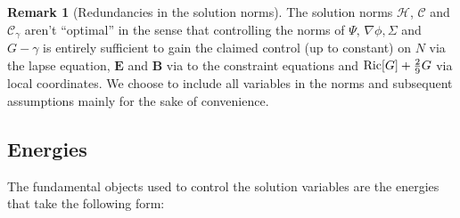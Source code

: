 \documentclass[11pt,leqno,textwidth=10cm]{amsart}
\numberwithin{equation}{section}
\theoremstyle{definition}
\newtheorem{remark}[definition]{Remark}
\theoremstyle{plain}
\newcommand{\1}{\mathbbm{1}}
\newcommand{\Ric}{\text{\normalfont{Ric}}}
\newcommand{\RE}{\bm{E}}
\newcommand{\RB}{\bm{B}}
\begin{document}
\begin{remark}[Redundancies in the solution norms]\label{rem:redundancy}
The solution norms $\mathcal{H}$, $\mathcal{C}$ and $\mathcal{C}_\gamma$ aren't \enquote{optimal} in the sense that controlling the norms of $\Psi,\,\nabla\phi,\Sigma$ and $G-\gamma$ is entirely sufficient to gain the claimed control (up to constant) on $N$ via the lapse equation, $\RE$ and $\RB$ via to the constraint equations and $\Ric[G]+\frac29G$ via local coordinates. We choose to include all variables in the norms and subsequent assumptions mainly for the sake of convenience.
\end{remark}


\subsection{Energies}\label{subsec:en}

The fundamental objects used to control the solution variables are the energies that take the following form:
\end{document}
